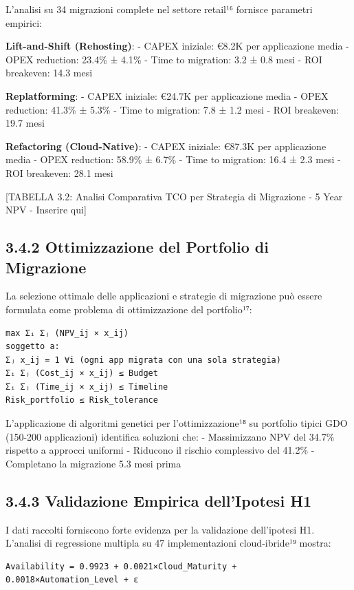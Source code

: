 \documentclass[12pt,a4paper,oneside]{book}
\numberwithin{figure}{chapter} %
\numberwithin{table}{chapter}  %
\begin{document}
L'analisi su 34 migrazioni complete nel settore retail¹⁶ fornisce
parametri empirici:

\textbf{Lift-and-Shift (Rehosting)}: - CAPEX iniziale: €8.2K per
applicazione media - OPEX reduction: 23.4\% ± 4.1\% - Time to migration:
3.2 ± 0.8 mesi - ROI breakeven: 14.3 mesi

\textbf{Replatforming}: - CAPEX iniziale: €24.7K per applicazione media
- OPEX reduction: 41.3\% ± 5.3\% - Time to migration: 7.8 ± 1.2 mesi -
ROI breakeven: 19.7 mesi

\textbf{Refactoring (Cloud-Native)}: - CAPEX iniziale: €87.3K per
applicazione media - OPEX reduction: 58.9\% ± 6.7\% - Time to migration:
16.4 ± 2.3 mesi - ROI breakeven: 28.1 mesi

{[}TABELLA 3.2: Analisi Comparativa TCO per Strategia di Migrazione - 5
Year NPV - Inserire qui{]}

\subsection{3.4.2 Ottimizzazione del Portfolio di
Migrazione}\label{ottimizzazione-del-portfolio-di-migrazione}

La selezione ottimale delle applicazioni e strategie di migrazione può
essere formulata come problema di ottimizzazione del portfolio¹⁷:

\begin{verbatim}
max Σᵢ Σⱼ (NPV_ij × x_ij)
soggetto a:
Σⱼ x_ij = 1 ∀i (ogni app migrata con una sola strategia)
Σᵢ Σⱼ (Cost_ij × x_ij) ≤ Budget
Σᵢ Σⱼ (Time_ij × x_ij) ≤ Timeline
Risk_portfolio ≤ Risk_tolerance
\end{verbatim}

L'applicazione di algoritmi genetici per l'ottimizzazione¹⁸ su portfolio
tipici GDO (150-200 applicazioni) identifica soluzioni che: -
Massimizzano NPV del 34.7\% rispetto a approcci uniformi - Riducono il
rischio complessivo del 41.2\% - Completano la migrazione 5.3 mesi prima

\subsection{3.4.3 Validazione Empirica dell'Ipotesi
H1}\label{validazione-empirica-dellipotesi-h1}

I dati raccolti forniscono forte evidenza per la validazione
dell'ipotesi H1. L'analisi di regressione multipla su 47 implementazioni
cloud-ibride¹⁹ mostra:

\begin{verbatim}
Availability = 0.9923 + 0.0021×Cloud_Maturity + 0.0018×Automation_Level + ε
\end{verbatim}
\end{document}
